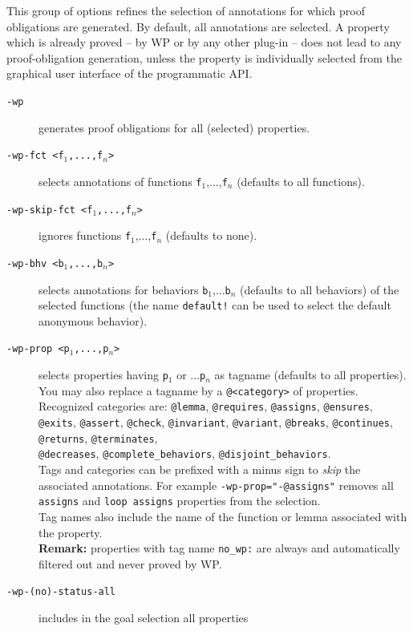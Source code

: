 This group of options refines the selection of annotations for which
proof obligations are generated. By default, all annotations are
selected. A property which is already proved -- by \textsf{WP} or by
any other plug-in -- does not lead to any proof-obligation generation,
unless the property is individually selected from the graphical user
interface of the programmatic API.

\begin{description}
\item [\tt -wp] generates proof obligations for all (selected) properties.
\item [\tt -wp-fct <f$_1$,...,f$_n$>] selects annotations of functions
  \texttt{f$_1$},...,\texttt{f$_n$} (defaults to all functions).
\item [\tt -wp-skip-fct <f$_1$,...,f$_n$>] ignores
  functions \texttt{f$_1$},...,\texttt{f$_n$} (defaults to none).
\item [\tt -wp-bhv <b$_1$,...,b$_n$>] selects annotations for behaviors
  \texttt{b$_1$},...\texttt{b$_n$} (defaults to all behaviors) of the
  selected functions (the name \texttt{default!} can be used to select
  the default anonymous behavior).
\item [\tt -wp-prop <p$_1$,...,p$_n$>] selects properties having
  \texttt{p$_1$} or ...\texttt{p$_n$} as tagname (defaults to all
  properties). You may also replace a tagname by a
    \texttt{@<category>} of properties.
    \\
    Recognized categories are: \texttt{@lemma}, \texttt{@requires}, \texttt{@assigns},
    \texttt{@ensures}, \texttt{@exits}, \texttt{@assert}, \texttt{@check},
    \texttt{@invariant}, \texttt{@variant}, \texttt{@breaks},
    \texttt{@continues}, \texttt{@returns}, \texttt{@terminates},\\
    \texttt{@decreases},
    \texttt{\mbox{@complete\_behaviors}}, \texttt{\mbox{@disjoint\_behaviors}}.
    \\
    Tags and categories can be prefixed with a minus sign to \emph{skip}
    the associated annotations.
    For example \texttt{-wp-prop="-@assigns"} removes all \texttt{assigns}
    and \texttt{loop assigns} properties from the selection.
    \\
    Tag names also include the name of the function or
    lemma associated with the property.
    \\
    \textbf{Remark:} properties with tag name \verb+no_wp:+ are always and automatically
    filtered out and never proved by \textsf{WP}.
\item [\tt -wp-(no)-status-all] includes in the goal selection all properties

\end{description}
